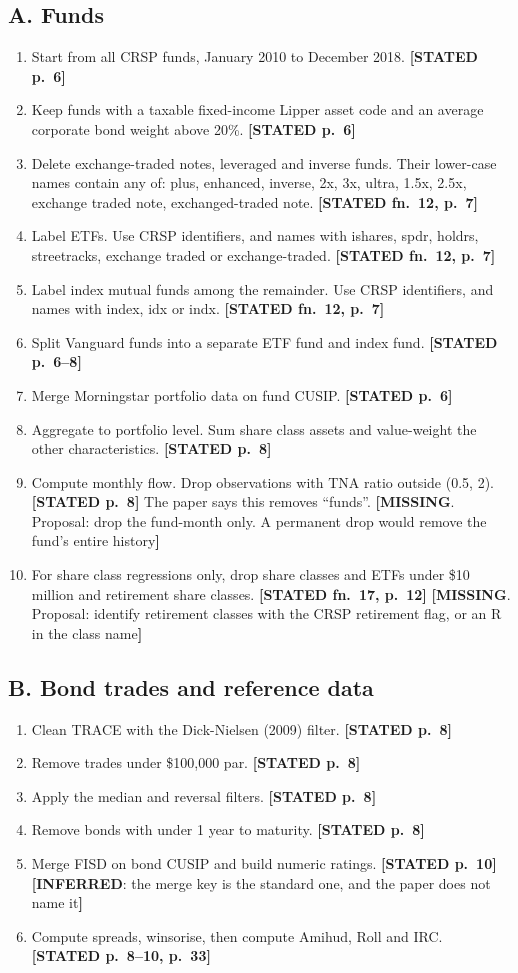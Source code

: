 \documentclass[10pt,a4paper]{article}
\newcommand{\ST}[1]{\textcolor{cst}{\textbf{[STATED #1]}}}
\newcommand{\IN}[1]{\textcolor{cin}{\textbf{[INFERRED}: #1\textbf{]}}}
\newcommand{\MI}[1]{\textcolor{cmi}{\textbf{[MISSING}. Proposal: #1\textbf{]}}}
\begin{document}
\subsection*{A. Funds}
\begin{enumerate}
\item Start from all CRSP funds, January 2010 to December 2018. \ST{p.~6}
\item Keep funds with a taxable fixed-income Lipper asset code and an average corporate bond weight above 20\%. \ST{p.~6}
\item Delete exchange-traded notes, leveraged and inverse funds. Their lower-case names contain any of: plus, enhanced, inverse, 2x, 3x, ultra, 1.5x, 2.5x, exchange traded note, exchanged-traded note. \ST{fn.~12, p.~7}
\item Label ETFs. Use CRSP identifiers, and names with ishares, spdr, holdrs, streetracks, exchange traded or exchange-traded. \ST{fn.~12, p.~7}
\item Label index mutual funds among the remainder. Use CRSP identifiers, and names with index, idx or indx. \ST{fn.~12, p.~7}
\item Split Vanguard funds into a separate ETF fund and index fund. \ST{p.~6--8}
\item Merge Morningstar portfolio data on fund CUSIP. \ST{p.~6}
\item Aggregate to portfolio level. Sum share class assets and value-weight the other characteristics. \ST{p.~8}
\item Compute monthly flow. Drop observations with TNA ratio outside (0.5, 2). \ST{p.~8} The paper says this removes ``funds''. \MI{drop the fund-month only. A permanent drop would remove the fund's entire history}
\item For share class regressions only, drop share classes and ETFs under \$10 million and retirement share classes. \ST{fn.~17, p.~12} \MI{identify retirement classes with the CRSP retirement flag, or an R in the class name}
\end{enumerate}

\subsection*{B. Bond trades and reference data}
\begin{enumerate}[resume]
\item Clean TRACE with the Dick-Nielsen (2009) filter. \ST{p.~8}
\item Remove trades under \$100,000 par. \ST{p.~8}
\item Apply the median and reversal filters. \ST{p.~8}
\item Remove bonds with under 1 year to maturity. \ST{p.~8}
\item Merge FISD on bond CUSIP and build numeric ratings. \ST{p.~10} \IN{the merge key is the standard one, and the paper does not name it}
\item Compute spreads, winsorise, then compute Amihud, Roll and IRC. \ST{p.~8--10, p.~33}
\end{enumerate}
\end{document}

